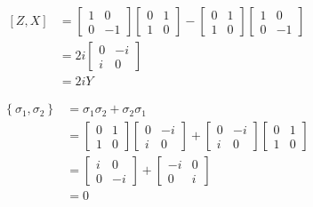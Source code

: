 \begin{align*}
	\left[Z, X\right] &= \begin{bmatrix}
	1 & 0 \\
	0 & -1
	\end{bmatrix}
	\begin{bmatrix}
	0 & 1 \\
	1 & 0
	\end{bmatrix}
	-
	\begin{bmatrix}
	0 & 1 \\
	1 & 0
	\end{bmatrix}
	\begin{bmatrix}
	1 & 0 \\
	0 & -1
	\end{bmatrix}\\
	&=
	2i \begin{bmatrix}
	0 & -i \\
	i & 0
	\end{bmatrix}\\
	&= 2iY
\end{align*}



\begin{align*}
\left\{\sigma_1, \sigma_2 \right\} &=\sigma_1 \sigma_2 + \sigma_2 \sigma_1\\
&= \begin{bmatrix}
0 & 1 \\
1 & 0
\end{bmatrix}
\begin{bmatrix}
0 & -i \\
i & 0
\end{bmatrix}
+
\begin{bmatrix}
0 & -i \\
i & 0
\end{bmatrix}
\begin{bmatrix}
0 & 1 \\
1 & 0
\end{bmatrix} \\
%
&=
%
\begin{bmatrix}
i & 0 \\
0 & -i
\end{bmatrix}
+
\begin{bmatrix}
-i & 0 \\
0 & i
\end{bmatrix}\\
%
&= 0
\end{align*}



